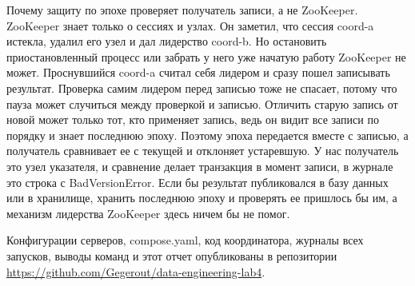 Почему защиту по эпохе проверяет получатель записи, а не ZooKeeper.
ZooKeeper знает только о сессиях и узлах. Он заметил, что сессия coord-a
истекла, удалил его узел и дал лидерство coord-b. Но остановить
приостановленный процесс или забрать у него уже начатую работу ZooKeeper не
может. Проснувшийся coord-a считал себя лидером и сразу пошел записывать
результат. Проверка самим лидером перед записью тоже не спасает, потому что
пауза может случиться между проверкой и записью. Отличить старую запись от
новой может только тот, кто применяет запись, ведь он видит все записи по
порядку и знает последнюю эпоху. Поэтому эпоха передается вместе с записью,
а получатель сравнивает ее с текущей и отклоняет устаревшую. У нас получатель
это узел указателя, и сравнение делает транзакция в момент записи, в журнале
это строка с BadVersionError. Если бы результат публиковался в базу данных
или в хранилище, хранить последнюю эпоху и проверять ее пришлось бы им, а
механизм лидерства ZooKeeper здесь ничем бы не помог.

Конфигурации серверов, compose.yaml, код координатора, журналы всех запусков,
выводы команд и этот отчет опубликованы в репозитории
\url{https://github.com/Gegerout/data-engineering-lab4}.

